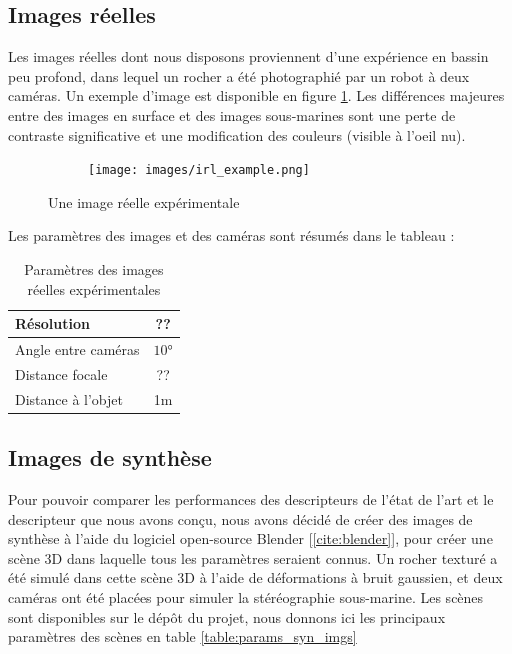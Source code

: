 \documentclass[
	a4paper, %
	10pt, %
	unnumberedsections, %
	twoside, %
]{LTJournalArticle}
\begin{document}
\subsection{Images réelles}

Les images réelles dont nous disposons proviennent d'une expérience en bassin peu profond, dans lequel un rocher a été photographié par un robot à deux caméras. Un exemple d'image est disponible en figure \ref{figure:irl_example}.
Les différences majeures entre des images en surface et des images sous-marines sont une perte de contraste significative et une modification des couleurs (visible à l'oeil nu).

\begin{figure}
	\centering
	\begin{subfigure}[H]{\columnwidth}
		\centering
		\texttt{[image: images/irl\_example.png]}
	\end{subfigure}
	\label{figure:irl_example}
	\caption{Une image réelle expérimentale}
\end{figure}

Les paramètres des images et des caméras sont résumés dans le tableau  :

\begin{table}[t]
	\begin{adjustbox}{width=\columnwidth, left}
		\begin{tabular}{l c}
			\hline
			Résolution 	 & ?? \\
			\hline
			Angle entre caméras         & $10$°        \\
			Distance focale         & ??                   \\
			Distance à l'objet  & 1m \\
			\hline
		\end{tabular}
	\end{adjustbox}
	\label{table:params_irl_imgs}
	\caption{Paramètres des images réelles expérimentales}
\end{table}

\subsection{Images de synthèse}

Pour pouvoir comparer les performances des descripteurs de l'état de l'art et le descripteur que nous avons conçu, nous avons décidé de créer des images de synthèse à l'aide du logiciel open-source Blender [\ref{cite:blender}], pour créer une scène 3D dans laquelle tous les paramètres seraient connus.
Un rocher texturé a été simulé dans cette scène 3D à l'aide de déformations à bruit gaussien, et deux caméras ont été placées pour simuler la stéréographie sous-marine.
Les scènes sont disponibles sur le dépôt du projet, nous donnons ici les principaux paramètres des scènes en table \ref{table:params_syn_imgs}
\end{document}
